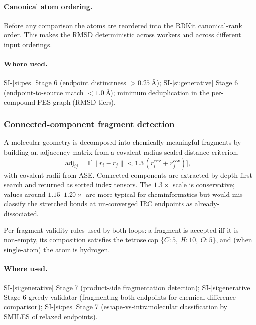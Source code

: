 \paragraph{Canonical atom ordering.}
Before any comparison the atoms are reordered into the RDKit canonical-rank order. This makes the RMSD deterministic across workers and across different input orderings.

\paragraph{Where used.}
SI-\ref{si:pes} Stage 6 (endpoint distinctness $> \SI{0.25}{\angstrom}$); SI-\ref{si:generative} Stage 6 (endpoint-to-source match $< \SI{1.0}{\angstrom}$); minimum deduplication in the per-compound PES graph (RMSD tiers).


\subsubsection{Connected-component fragment detection}
\label{sec:shared-fragments}

A molecular geometry is decomposed into chemically-meaningful fragments by building an adjacency matrix from a covalent-radius-scaled distance criterion,
\begin{equation}
    \text{adj}_{ij} = \mathbb{I}\bigl[\lVert r_i - r_j \rVert < 1.3\,(r^{\text{cov}}_i + r^{\text{cov}}_j)\bigr],
\end{equation}
with covalent radii from ASE. Connected components are extracted by depth-first search and returned as sorted index tensors. The $1.3\times$ scale is conservative; values around $1.15$--$1.20\times$ are more typical for cheminformatics but would mis-classify the stretched bonds at un-converged IRC endpoints as already-dissociated.

Per-fragment validity rules used by both loops: a fragment is accepted iff it is non-empty, its composition satisfies the tetrose cap $\{C{:}5,\ H{:}10,\ O{:}5\}$, and (when single-atom) the atom is hydrogen.

\paragraph{Where used.}
SI-\ref{si:generative} Stage 7 (product-side fragmentation detection); SI-\ref{si:generative} Stage 6 greedy validator (fragmenting both endpoints for chemical-difference comparison); SI-\ref{si:pes} Stage 7 (escape-vs-intramolecular classification by SMILES of relaxed endpoints).


